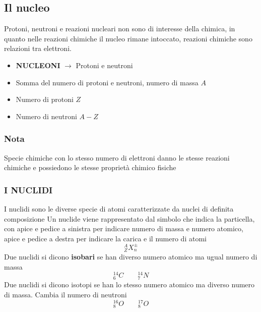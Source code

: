 \documentclass{article}
\begin{document}
\subsection{Il nucleo}
Protoni, neutroni e reazioni nucleari non sono di interesse della chimica, in quanto nelle reazioni chimiche il nucleo rimane intoccato, reazioni chimiche sono relazioni tra elettroni. 
\begin{itemize}
    \item \textbf{NUCLEONI} $\rightarrow$ Protoni e neutroni
    \item Somma del numero di protoni e neutroni, numero di massa $A$
    \item Numero di protoni $Z$
    \item Numero di neutroni $A-Z$
\end{itemize}
\subsubsection*{Nota}
Specie chimiche con lo stesso numero di elettroni danno le stesse reazioni chimiche e possiedono le stesse proprietà chimico fisiche
\subsubsection{I NUCLIDI}
I nuclidi sono le diverse specie di atomi caratterizzate da nuclei di definita composizione Un nuclide viene rappresentato dal simbolo che indica la particella, con apice e pedice a sinistra per indicare numero di massa e numero atomico, apice e pedice a destra per indicare la carica e il numero di atomi
\[
^A_ZX^\pm _n
\]
Due nuclidi si dicono \textbf{isobari} se han diverso numero atomico ma ugual numero di massa
\[
^{14}_6C \qquad  ^{14}_7N
\]
Due nuclidi si dicono isotopi se han lo stesso numero atomico ma diverso numero di massa. Cambia il numero di neutroni
\[
^{16}_8O \qquad ^{17}_8O
\]
\end{document}
